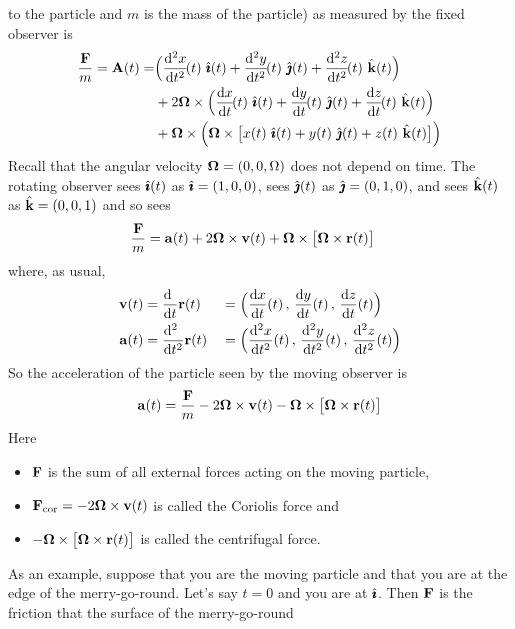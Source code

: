 to the particle and $m$ is the mass of the particle) 
as measured  by the fixed observer is
\begin{align*}
\frac{\vF}{m}
=\vA(t)
=&  \Big(\difftwo{x}{t}\!(t)\ \hi(t) 
                         + \difftwo{y}{t}\!(t)\ \hj(t) 
                         + \difftwo{z}{t}\!(t)\ \hk(t)\Big) \\
& +2\vOmega\times\Big(\diff{x}{t}\!(t)\ \hi(t)
                                  +\diff{y}{t}\!(t)\ \hj(t)
                                  +\diff{z}{t}\!(t)\ \hk(t)\Big) \\
&+\vOmega\times\Big(\vOmega\times\big[x(t)\ \hi(t)
                                  +y(t)\ \hj(t)
                                  +z(t)\ \hk(t)\big]\Big)
\end{align*}
Recall that the angular velocity $\mathbf{\Omega}=(0,0,\Omega)$ does 
not depend on time.
The rotating observer sees $\hat{\pmb{\imath}}(t)$ as $\hat{\pmb{\imath}}=(1,0,0)$,
sees $\hat{\pmb{\jmath}}(t)$ as $\hat{\pmb{\jmath}}=(0,1,0)$, and sees $\hat{\mathbf{k}}(t)$ as $\hat{\mathbf{k}}=(0,0,1)$ and so sees
\begin{align*}
\frac{\mathbf{F}}{m}
&=\mathbf{a}(t) + 2\mathbf{\Omega}\times\mathbf{v}(t) +\mathbf{\Omega}\times\big[\mathbf{\Omega}\times\mathbf{r}(t)\big]
\end{align*}
where, as usual,
\begin{alignat*}{3}
\vv(t) &= \diff{\hfill}{t}\vr(t)
       &&= \Big(\diff{x}{t}(t)\,,\,\diff{y}{t}(t)\,,\,\diff{z}{t}(t)\Big) \\
\va(t) &= \difftwo{\hfill}{t}\vr(t)
    &&= \Big(\difftwo{x}{t}(t)\,,\,\difftwo{y}{t}(t)\,,\,\difftwo{z}{t}(t)\Big)
\end{alignat*}
So the acceleration of the particle seen by the moving observer is
\begin{align*}
\mathbf{a}(t) = \frac{\mathbf{F}}{m} -  2\mathbf{\Omega}\times\mathbf{v}(t)      
                     - \mathbf{\Omega}\times\big[\mathbf{\Omega}\times\mathbf{r}(t)\big]
\end{align*}
Here 
\begin{itemize}\itemsep1pt \parskip0pt 
\item 
   $\mathbf{F}$ is the sum of all external forces acting on the moving particle, 
\item 
   $\mathbf{F}_{{\rm cor}}=-2 \mathbf{\Omega}\times\mathbf{v}(t)$ is called the Coriolis force and
\item
   $ - \mathbf{\Omega}\times\big[\mathbf{\Omega}\times\mathbf{r}(t)\big]$ is called the centrifugal force.
\end{itemize}
As an example, suppose that you are the moving particle and that
you are at the edge of the merry-go-round. Let's say $t=0$ and you are
at $\hat{\pmb{\imath}}$. Then $\mathbf{F}$ is the friction that the surface of the merry-go-round 
